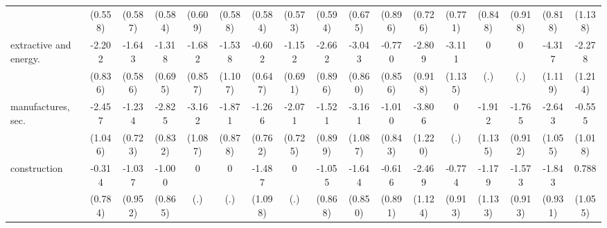 {\begin{tabular}{l*{16}{c}}
                    &     (0.558)         &     (0.587)         &     (0.584)         &     (0.609)         &     (0.588)         &     (0.584)         &     (0.573)         &     (0.594)         &     (0.675)         &     (0.896)         &     (0.726)         &     (0.771)         &     (0.848)         &     (0.918)         &     (0.818)         &     (1.138)         \\
[1em]
extractive and energy.&      -2.202\sym{**} &      -1.643\sym{**} &      -1.318         &      -1.682\sym{*}  &      -1.538         &      -0.602         &      -1.152         &      -2.662\sym{**} &      -3.043\sym{***}&      -0.770         &      -2.809\sym{**} &      -3.111\sym{**} &           0         &           0         &      -4.317\sym{***}&      -2.278         \\
                    &     (0.836)         &     (0.586)         &     (0.695)         &     (0.857)         &     (1.107)         &     (0.647)         &     (0.691)         &     (0.896)         &     (0.860)         &     (0.856)         &     (0.918)         &     (1.135)         &         (.)         &         (.)         &     (1.119)         &     (1.214)         \\
[1em]
manufactures, sec.  &      -2.457\sym{*}  &      -1.234         &      -2.825\sym{***}&      -3.162\sym{**} &      -1.871\sym{*}  &      -1.266         &      -2.071\sym{**} &      -1.521         &      -3.161\sym{**} &      -1.010         &      -3.806\sym{**} &           0         &      -1.912         &      -1.765         &      -2.643\sym{*}  &      -0.555         \\
                    &     (1.046)         &     (0.723)         &     (0.832)         &     (1.087)         &     (0.878)         &     (0.762)         &     (0.725)         &     (0.899)         &     (1.087)         &     (0.843)         &     (1.220)         &         (.)         &     (1.135)         &     (0.912)         &     (1.055)         &     (1.018)         \\
[1em]
construction        &      -0.314         &      -1.037         &      -1.000         &           0         &           0         &      -1.487         &           0         &      -1.055         &      -1.644         &      -0.616         &      -2.469\sym{*}  &      -0.774         &      -1.179         &      -1.573         &      -1.843\sym{*}  &       0.788         \\
                    &     (0.784)         &     (0.952)         &     (0.865)         &         (.)         &         (.)         &     (1.098)         &         (.)         &     (0.868)         &     (0.850)         &     (0.891)         &     (1.124)         &     (0.913)         &     (1.133)         &     (0.913)         &     (0.931)         &     (1.055)         \\

\end{tabular}}
